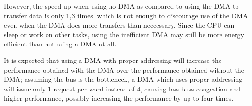 However, the speed-up when using no DMA as compared to using the DMA to transfer data is only
1,3 times, which is not enough to discourage use of the DMA even when the DMA does more transfers
than neccessary. Since the CPU can sleep or work on other tasks, using the inefficient DMA may
still be more energy efficient than not using a DMA at all.

It is expected that using a DMA with proper addressing will increase the performance obtained
with the DMA over the performance obtained without the DMA; assuming the bus is the bottleneck,
a DMA which uses proper addressing will issue only 1 request per word instead of 4, causing
less buss congestion and higher performance, possibly increasing the performance by up to
four times.

